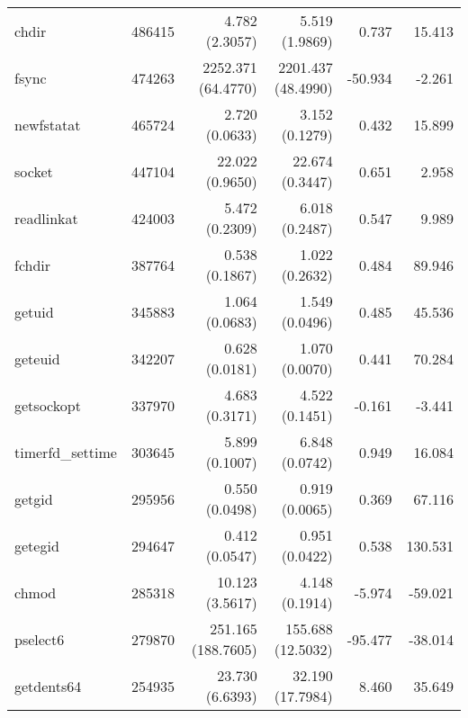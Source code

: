 \begin{longtable}{>{\ttfamily}lrrrrr}
                          chdir &     486415 &           4.782 (2.3057) &           5.519 (1.9869) &           0.737 &       15.413 \\
                          fsync &     474263 &       2252.371 (64.4770) &       2201.437 (48.4990) &         -50.934 &       -2.261 \\
                     newfstatat &     465724 &           2.720 (0.0633) &           3.152 (0.1279) &           0.432 &       15.899 \\
                         socket &     447104 &          22.022 (0.9650) &          22.674 (0.3447) &           0.651 &        2.958 \\
                     readlinkat &     424003 &           5.472 (0.2309) &           6.018 (0.2487) &           0.547 &        9.989 \\
                         fchdir &     387764 &           0.538 (0.1867) &           1.022 (0.2632) &           0.484 &       89.946 \\
                         getuid &     345883 &           1.064 (0.0683) &           1.549 (0.0496) &           0.485 &       45.536 \\
                        geteuid &     342207 &           0.628 (0.0181) &           1.070 (0.0070) &           0.441 &       70.284 \\
                     getsockopt &     337970 &           4.683 (0.3171) &           4.522 (0.1451) &          -0.161 &       -3.441 \\
               timerfd\_settime &     303645 &           5.899 (0.1007) &           6.848 (0.0742) &           0.949 &       16.084 \\
                         getgid &     295956 &           0.550 (0.0498) &           0.919 (0.0065) &           0.369 &       67.116 \\
                        getegid &     294647 &           0.412 (0.0547) &           0.951 (0.0422) &           0.538 &      130.531 \\
                          chmod &     285318 &          10.123 (3.5617) &           4.148 (0.1914) &          -5.974 &      -59.021 \\
                       pselect6 &     279870 &       251.165 (188.7605) &        155.688 (12.5032) &         -95.477 &      -38.014 \\
                     getdents64 &     254935 &          23.730 (6.6393) &         32.190 (17.7984) &           8.460 &       35.649 \\

\end{longtable}
